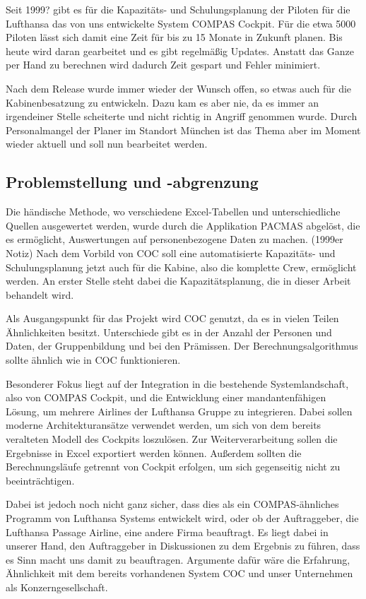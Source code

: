 \documentclass [12pt, a4paper, oneside, titlepage, ngerman]{article}
\begin{document}
\noindent Seit 1999? gibt es für die Kapazitäts- und Schulungsplanung der Piloten für die Lufthansa das von uns entwickelte System COMPAS Cockpit. Für die etwa 5000 Piloten lässt sich damit eine Zeit für bis zu 15 Monate in Zukunft planen. Bis heute wird daran gearbeitet und es gibt regelmäßig Updates. Anstatt das Ganze per Hand zu berechnen wird dadurch Zeit gespart und Fehler minimiert.

\noindent Nach dem Release wurde immer wieder der Wunsch offen, so etwas auch für die Kabinenbesatzung zu entwickeln. Dazu kam es aber nie, da es immer an irgendeiner Stelle scheiterte und nicht richtig in Angriff genommen wurde. Durch Personalmangel der Planer im Standort München ist das Thema aber im Moment wieder aktuell und soll nun bearbeitet werden.

\subsection {Problemstellung und -abgrenzung}
Die händische Methode, wo verschiedene Excel-Tabellen und unterschiedliche Quellen ausgewertet werden, wurde durch die {\color{red} Applikation PACMAS abgelöst, die  es ermöglicht, Auswertungen auf personenbezogene Daten zu machen. (1999er Notiz)}
Nach dem Vorbild von COC soll eine automatisierte Kapazitäts- und Schulungsplanung jetzt auch für die Kabine, also die komplette Crew, ermöglicht werden. An erster Stelle steht dabei die Kapazitätsplanung, die in dieser Arbeit behandelt wird.

\noindent Als Ausgangspunkt für das Projekt wird COC genutzt, da es in vielen Teilen Ähnlichkeiten besitzt. Unterschiede gibt es in der Anzahl der Personen und Daten, der Gruppenbildung und bei den Prämissen. Der Berechnungsalgorithmus sollte ähnlich wie in COC funktionieren. 

\noindent Besonderer Fokus liegt auf der Integration in die bestehende Systemlandschaft, also von COMPAS Cockpit, und die Entwicklung einer mandantenfähigen Lösung, um mehrere Airlines der Lufthansa Gruppe zu integrieren. Dabei sollen moderne Architekturansätze verwendet werden, um sich von dem bereits veralteten Modell des Cockpits loszulösen.
Zur Weiterverarbeitung sollen die Ergebnisse in Excel exportiert werden können. Außerdem sollten die Berechnungsläufe getrennt von Cockpit erfolgen, um sich gegenseitig nicht zu beeinträchtigen.

\noindent Dabei ist jedoch noch nicht ganz sicher, dass dies als ein COMPAS-ähnliches Programm von Lufthansa Systems entwickelt wird, oder ob der Auftraggeber, die Lufthansa Passage Airline, eine andere Firma beauftragt. Es liegt dabei in unserer Hand, den Auftraggeber in Diskussionen zu dem Ergebnis zu führen, dass es Sinn macht uns damit zu beauftragen. Argumente dafür wäre die Erfahrung, Ähnlichkeit mit dem bereits vorhandenen System COC und unser Unternehmen als Konzerngesellschaft.
\end{document}
